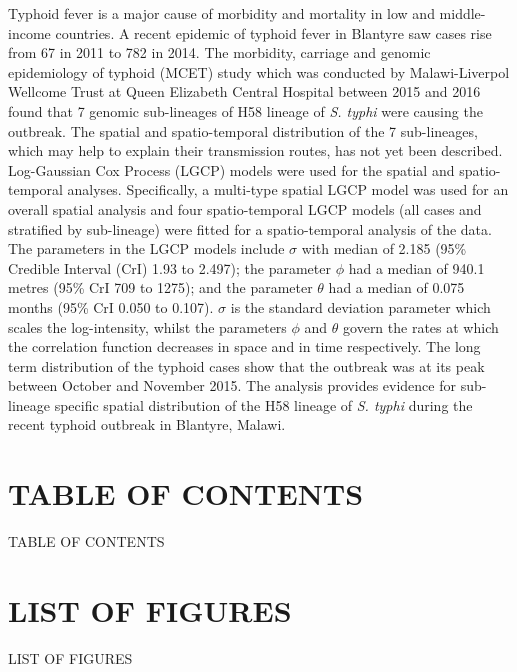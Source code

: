 \documentclass[12pt,a4paper]{report}
\makeatletter
\renewcommand\tableofcontents{%
	\section*{\contentsname}%
	\@mkboth{\MakeUppercase\contentsname}%
	{\MakeUppercase\contentsname}%
	\@starttoc{toc}%
}
\renewcommand\listoffigures{%
	\section*{\listfigurename}%
	\@mkboth{\MakeUppercase\listfigurename}%
	{\MakeUppercase\listfigurename}%
	\@starttoc{lof}%
}
\makeatother
\begin{document}
Typhoid fever is a major cause of morbidity and mortality in low and middle-income countries. A recent epidemic of typhoid fever in Blantyre saw cases rise from 67 in 2011 to 782 in 2014. The morbidity, carriage and genomic epidemiology of typhoid (MCET) study which was conducted by Malawi-Liverpol Wellcome Trust at Queen Elizabeth Central Hospital between 2015 and 2016 found that 7 genomic sub-lineages of H58 lineage of \textit{S. typhi} were causing the outbreak. The spatial and spatio-temporal distribution of the 7 sub-lineages, which may help to explain their transmission routes, has not yet been described. Log-Gaussian Cox Process (LGCP) models were used for the spatial and spatio-temporal analyses. Specifically, a multi-type spatial LGCP model was used for an overall spatial analysis and four spatio-temporal LGCP models (all cases and stratified by sub-lineage) were fitted for a spatio-temporal analysis of the data. The parameters in the LGCP models include $\sigma$ with median of 2.185 (95\% Credible Interval (CrI) 1.93 to 2.497); the parameter $\phi$ had a median of 940.1 metres (95\% CrI 709 to 1275); and the parameter $\theta$ had a median of 0.075 months (95\% CrI 0.050 to 0.107). $\sigma$ is the standard deviation parameter which scales the log-intensity, whilst the parameters $\phi$ and $\theta$ govern the rates at which the correlation function decreases in space and in time respectively. The long term distribution of the typhoid cases show that the outbreak was at its peak between October and November 2015. The analysis provides evidence for sub-lineage specific spatial distribution of the H58 lineage of \textit{S. typhi} during the recent typhoid outbreak in Blantyre, Malawi.

\restoregeometry

\renewcommand\contentsname{\centering TABLE OF CONTENTS}
	 
\tableofcontents



\newpage


\renewcommand{\listfigurename}{\centering LIST OF FIGURES}

\listoffigures


\newpage


\renewcommand{\listtablename}{\centering LIST OF TABLES}
\end{document}
